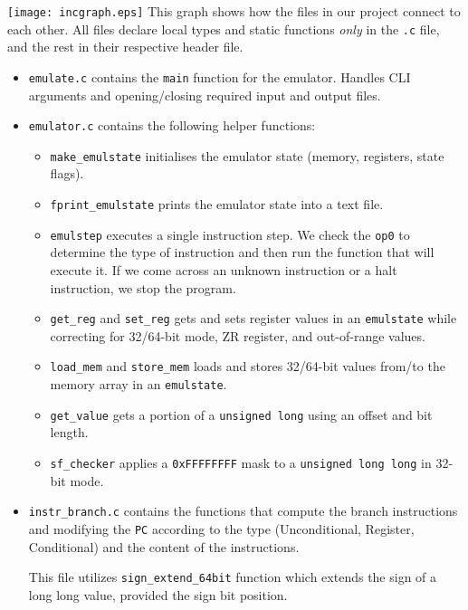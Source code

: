 \documentclass[11pt]{article}
\begin{document}
\texttt{[image: incgraph.eps]}
This graph shows how the files in our project connect to each other. All files declare local types and static functions \textit{only} in the \verb|.c| file, and the rest in their respective header file.

\begin{itemize}
    
    \item \verb|emulate.c| contains the \verb|main| function for the emulator. Handles CLI arguments and opening/closing required input and output files.

    \item \verb|emulator.c| contains the following helper functions:
    \begin{itemize}
        \item \verb|make_emulstate| initialises the emulator state (memory, registers, state flags).
        \item \verb|fprint_emulstate| prints the emulator state into a text file.
        \item \verb|emulstep| executes a single instruction step. We check the \verb|op0| to determine the type of instruction and then run the function that will execute it. If we come across an unknown instruction or a halt instruction, we stop the program.
        \item \verb|get_reg| and \verb|set_reg| gets and sets register values in an \verb|emulstate| while correcting for 32/64-bit mode, ZR register, and out-of-range values.
        \item \verb|load_mem| and \verb|store_mem| loads and stores 32/64-bit values from/to the memory array in an \verb|emulstate|.
        \item \verb|get_value| gets a portion of a \verb|unsigned long| using an offset and bit length.
        \item \verb|sf_checker| applies a \verb|0xFFFFFFFF| mask to a \verb|unsigned long long| in 32-bit mode.
    \end{itemize}

    \item \verb|instr_branch.c| contains the functions that compute the branch instructions  and modifying the \verb|PC| according to the type (Unconditional, Register, Conditional) and the content of the instructions.  

    This file utilizes \verb|sign_extend_64bit| function which extends the sign of a long long value, provided the sign bit position.


\end{itemize}
\end{document}
